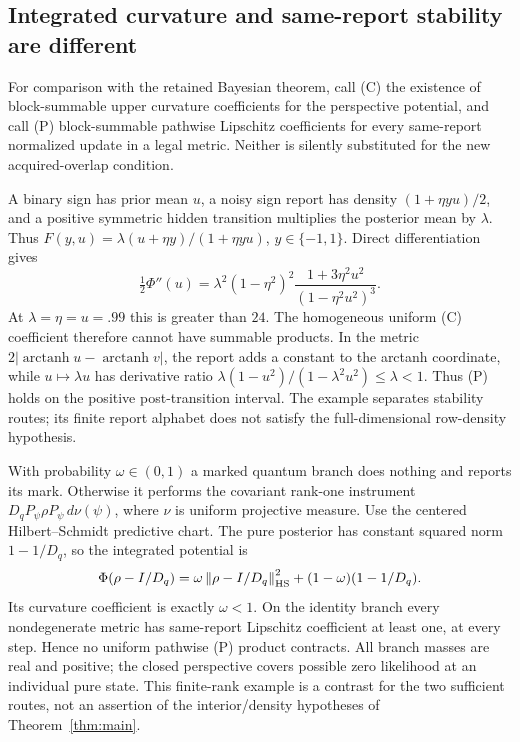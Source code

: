 \subsection{Integrated curvature and same-report stability are different}
For comparison with the retained Bayesian theorem, call (C) the existence of block-summable upper curvature coefficients for the perspective potential, and call (P) block-summable pathwise Lipschitz coefficients for every same-report normalized update in a legal metric. Neither is silently substituted for the new acquired-overlap condition.

\begin{example}\label{ex:Cfails}
A binary sign has prior mean $u$, a noisy sign report has density $(1+\eta yu)/2$, and a positive symmetric hidden transition multiplies the posterior mean by $\lambda$. Thus
$F(y,u)=\lambda(u+\eta y)/(1+\eta yu)$, $y\in\{-1,1\}$. Direct differentiation gives
\[
 \tfrac12\Phi''(u)=
 \lambda^2(1-\eta^2)^2\frac{1+3\eta^2u^2}{(1-\eta^2u^2)^3}.
\]
At $\lambda=\eta=u=.99$ this is greater than $24$. The homogeneous uniform (C) coefficient therefore cannot have summable products. In the metric $2|\operatorname{arctanh}u-\operatorname{arctanh}v|$, the report adds a constant to the arctanh coordinate, while $u\mapsto\lambda u$ has derivative ratio
$\lambda(1-u^2)/(1-\lambda^2u^2)\le\lambda<1$.
Thus (P) holds on the positive post-transition interval. The example separates stability routes; its finite report alphabet does not satisfy the full-dimensional row-density hypothesis.
\end{example}

\begin{example}\label{ex:Pfails}
With probability $\omega\in(0,1)$ a marked quantum branch does nothing and reports its mark. Otherwise it performs the covariant rank-one instrument
$D_qP_\psi\rho P_\psi\,d\nu(\psi)$, where $\nu$ is uniform projective measure. Use the centered Hilbert--Schmidt predictive chart. The pure posterior has constant squared norm $1-1/D_q$, so the integrated potential is
\[
 \Phi(\rho-I/D_q)=\omega\left\lVert\rho-I/D_q\right\rVert_{\mathrm{HS}}^2
                         +(1-\omega)(1-1/D_q).
\]
Its curvature coefficient is exactly $\omega<1$. On the identity branch every nondegenerate metric has same-report Lipschitz coefficient at least one, at every step. Hence no uniform pathwise (P) product contracts. All branch masses are real and positive; the closed perspective covers possible zero likelihood at an individual pure state. This finite-rank example is a contrast for the two sufficient routes, not an assertion of the interior/density hypotheses of Theorem~\ref{thm:main}.
\end{example}

